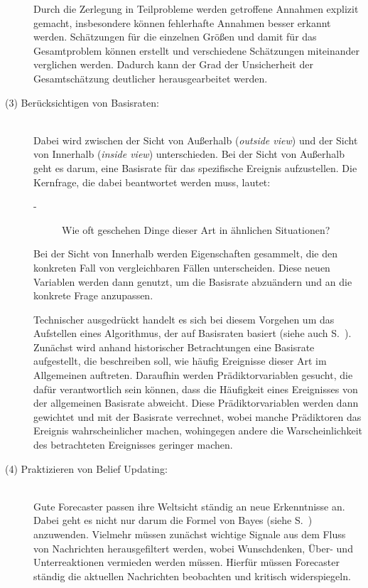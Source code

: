 \begin{description}
Durch die Zerlegung in Teilprobleme werden getroffene Annahmen explizit gemacht, insbesondere können
fehlerhafte Annahmen besser erkannt werden. Schätzungen für die einzelnen Größen und damit für das Gesamtproblem
können erstellt und verschiedene Schätzungen miteinander verglichen werden. Dadurch kann der Grad der Unsicherheit
der Gesamtschätzung deutlicher herausgearbeitet werden.

\item[(3) Berücksichtigen von Basisraten:] \hfill \\
Dabei wird zwischen der Sicht von Außerhalb (\emph{outside view}) und der Sicht von Innerhalb (\emph{inside view})
unterschieden. Bei der Sicht von Außerhalb geht es darum, eine Basisrate für das spezifische Ereignis aufzustellen.
Die Kernfrage, die dabei beantwortet werden muss, lautet:

\begin{description}
\item[-] Wie oft geschehen Dinge dieser Art in ähnlichen Situationen?
\end{description}

Bei der Sicht von Innerhalb werden Eigenschaften gesammelt, die den konkreten Fall von vergleichbaren Fällen
unterscheiden. Diese neuen Variablen werden dann genutzt, um die Basisrate abzuändern und an die konkrete
Frage anzupassen.

Technischer ausgedrückt handelt es sich bei diesem Vorgehen um das Aufstellen eines Algorithmus, der auf Basisraten
basiert (siehe auch S.~\xcom). Zunächst wird anhand historischer Betrachtungen eine Basisrate aufgestellt, die
beschreiben soll, wie häufig Ereignisse dieser Art im Allgemeinen auftreten. Daraufhin werden Prädiktorvariablen gesucht, die
dafür verantwortlich sein können, dass die Häufigkeit eines Ereignisses von der allgemeinen Basisrate abweicht. Diese
Prädiktorvariablen werden dann gewichtet und mit der Basisrate verrechnet, wobei manche Prädiktoren das Ereignis wahrscheinlicher
machen, wohingegen andere die Warscheinlichkeit des betrachteten Ereignisses geringer machen.

\item[(4) Praktizieren von Belief Updating:] \hfill \\
Gute Forecaster passen ihre Weltsicht ständig an neue Erkenntnisse an. Dabei geht es nicht nur darum die Formel von Bayes
(siehe S.~\xcom) anzuwenden. Vielmehr müssen zunächst wichtige Signale aus dem Fluss von Nachrichten herausgefiltert werden, wobei
Wunschdenken, Über- und Unterreaktionen vermieden werden müssen. Hierfür müssen Forecaster ständig die aktuellen Nachrichten beobachten 
und kritisch widerspiegeln.


\end{description}
